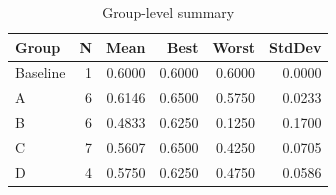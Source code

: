\begin{table}[htbp]
\centering
\caption{Group-level summary}
\label{tab:group-summary}
\begin{tabular}{lrrrrr}
\toprule
\textbf{Group} & \textbf{N} & \textbf{Mean} & \textbf{Best} & \textbf{Worst} & \textbf{StdDev} \\
\midrule
Baseline & 1 & 0.6000 & 0.6000 & 0.6000 & 0.0000 \\
A & 6 & 0.6146 & 0.6500 & 0.5750 & 0.0233 \\
B & 6 & 0.4833 & 0.6250 & 0.1250 & 0.1700 \\
C & 7 & 0.5607 & 0.6500 & 0.4250 & 0.0705 \\
D & 4 & 0.5750 & 0.6250 & 0.4750 & 0.0586 \\
\bottomrule
\end{tabular}
\end{table}